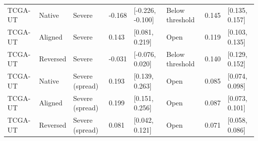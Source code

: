 \begin{tabular}{llllllll}
TCGA-UT & Native & Severe & -0.168 & [-0.226, -0.100] & Below threshold & 0.145 & [0.135, 0.157] \\
TCGA-UT & Aligned & Severe & 0.143 & [0.081, 0.219] & Open & 0.119 & [0.103, 0.135] \\
TCGA-UT & Reversed & Severe & -0.031 & [-0.076, 0.020] & Below threshold & 0.140 & [0.129, 0.152] \\
TCGA-UT & Native & Severe (spread) & 0.193 & [0.139, 0.263] & Open & 0.085 & [0.074, 0.098] \\
TCGA-UT & Aligned & Severe (spread) & 0.199 & [0.151, 0.256] & Open & 0.087 & [0.073, 0.101] \\
TCGA-UT & Reversed & Severe (spread) & 0.081 & [0.042, 0.121] & Open & 0.071 & [0.058, 0.086] \\
\bottomrule
\end{tabular}
